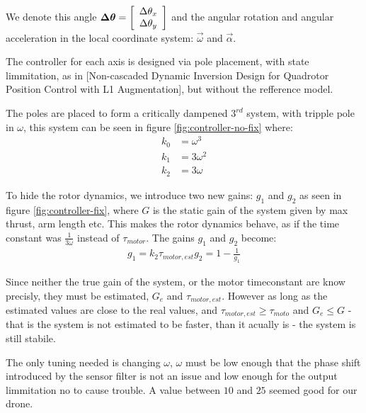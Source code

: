 We denote this angle $\vec{\Delta\theta} = \matrix{c}{}{}{ \Delta \theta_x \\
\Delta\theta_y}$ and the angular rotation and angular acceleration
in the local coordinate system: $\vec\omega$ and $\vec\alpha$.


The controller for each axis is designed via pole placement, with state
limmitation, as in [Non-cascaded Dynamic Inversion Design for Quadrotor Position
Control with L1 Augmentation], but without the refference model.

The poles are placed to form a critically dampened $3^{rd}$ system, with tripple
pole in $\omega$, this system can be seen in figure \ref{fig:controller-no-fix}
where:
\begin{align}
k_0 & = \omega^3\\
k_1 & = 3\omega^2\\
k_2 & = 3\omega
\end{align}


To hide the rotor dynamics, we introduce two new gains: $g_1$ and $g_2$ as seen
in figure \ref{fig:controller-fix}, where $G$ is the static gain of the system
given by max thrust, arm length etc.
This makes the rotor dynamics behave, as if the time constant was $\frac{1}{3\omega}$ instead of $\tau_{motor}$.
The gains $g_1$ and $g_2$ become:
\begin{align}
g_1 = k_2 \tau_{motor,est}
g_2 =1 - \frac{1}{g_1}
\end{align}


Since neither the true gain of the system, or the motor timeconstant are know
precisly, they must be estimated, $G_e$ and $\tau_{motor,est}$. However as long
as the estimated values are close to the real values, and $\tau_{motor,est} \geq
\tau_{moto}$ and $G_e \leq G$ - that is the system is not estimated to be
faster, than it acually is - the system is still stabile. %

The only tuning needed is changing $\omega$, $\omega$ must be low enough that
the phase shift introduced by the sensor filter is not an issue and low enough
for the output limmitation no to cause trouble. A value between $10$ and $25$
seemed good for our drone.


